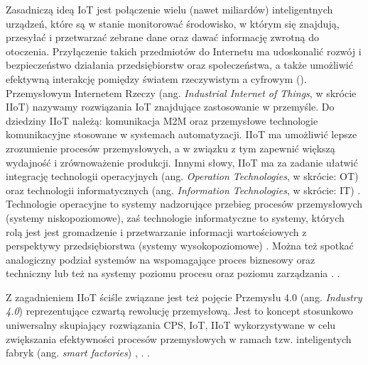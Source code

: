 \documentclass[a4paper, 12pt, twoside]{article}
\begin{document}
Zasadniczą ideą IoT jest połączenie wielu (nawet miliardów) inteligentnych urządzeń,
które są w stanie monitorować środowisko, w którym się znajdują, przesyłać 
i przetwarzać zebrane dane oraz dawać informację zwrotną do otoczenia. Przyłączenie
takich przedmiotów do Internetu ma udoskonalić rozwój i bezpieczeństwo
działania przedsiębiorstw oraz społeczeństwa, a także umożliwić efektywną
interakcję pomiędzy światem rzeczywistym a cyfrowym (). 
Przemysłowym Internetem Rzeczy (ang. \emph{Industrial Internet of Things}, w skrócie IIoT)
nazywamy rozwiązania IoT znajdujące zastosowanie w przemyśle. Do dziedziny
IIoT należą: komunikacja M2M oraz przemysłowe technologie komunikacyjne stosowane 
w systemach automatyzacji. IIoT ma umożliwić lepsze zrozumienie procesów
przemysłowych, a w związku z tym zapewnić większą wydajność i zrównoważenie
produkcji. Innymi słowy, IIoT ma za zadanie ułatwić integrację technologii operacyjnych 
(ang. \emph{Operation Technologies}, w skrócie: OT) oraz
technologii informatycznych (ang. \emph{Information Technologies}, w skrócie: IT) 
\cite{iiot-challenges-opportunities-directions}.
Technologie operacyjne to systemy nadzorujące przebieg procesów przemysłowych (systemy niskopoziomowe), 
zaś technologie informatyczne to systemy, których rolą jest jest gromadzenie 
i przetwarzanie informacji wartościowych z perspektywy przedsiębiorstwa (systemy wysokopoziomowe)
\cite{ot-it-categorization-of-customer-concerns}.
Można też spotkać analogiczny podział systemów na wspomagające proces biznesowy 
oraz techniczny lub też na systemy poziomu procesu oraz poziomu zarządzania \cite{isp}.
.

Z zagadnieniem IIoT ściśle związane jest też pojęcie Przemysłu 4.0 (ang. \emph{Industry 4.0})
reprezentujące czwartą rewolucję przemysłową. Jest to koncept stosunkowo uniwersalny
skupiający rozwiązania CPS, IoT, IIoT wykorzystywane w celu zwiększania efektywności
procesów przemysłowych w ramach tzw. inteligentych fabryk (ang. \emph{smart factories})
\cite{iiot-cyber-manufacturing-systems}, \cite{iiot-challenges-opportunities-directions}.
.
\end{document}
